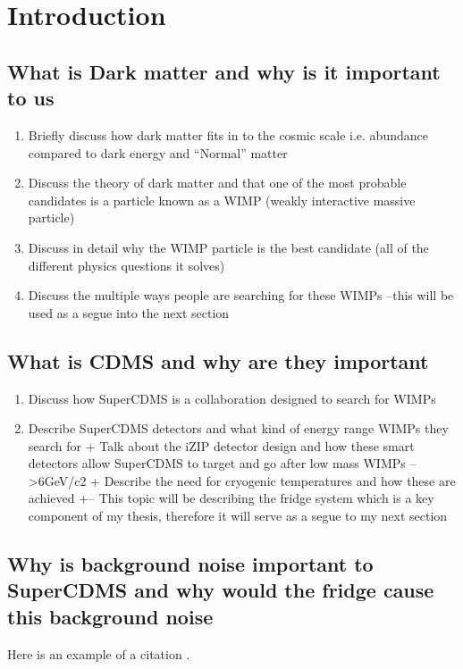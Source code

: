 \section{Introduction}
\subsection{What is Dark matter and why is it important to us} \label{sec:darkmatter}
\begin{figure}
\label{fig:galaxies}
\end{figure}

\begin{enumerate}
    \item Briefly discuss how dark matter fits in to the cosmic scale i.e. abundance compared to dark energy and “Normal” matter
    \item Discuss the theory of dark matter and that one of the most probable candidates is a particle known as a WIMP (weakly interactive massive particle)
    \item Discuss in detail why the WIMP particle is the best candidate (all of the different physics questions it solves)
    \item Discuss the multiple ways people are searching for these WIMPs –this will be used as a segue into the next section
\end{enumerate}

\subsection{What is CDMS and why are they important}

\begin{enumerate}
    \item Discuss how SuperCDMS is a collaboration designed to search for WIMPs
    \item Describe SuperCDMS detectors and what kind of energy range WIMPs they search for 
        + Talk about the iZIP detector design and how these smart detectors allow SuperCDMS to target and go after low mass WIMPs –   >6GeV/c2
        + Describe the need for cryogenic temperatures and how these are achieved
        +--	This topic will be describing the fridge system which is a key component of my thesis, therefore it will serve as a segue to my next section 
\end{enumerate}

\subsection{	Why is background noise important to SuperCDMS and why would the fridge cause this background noise}
Here is an example of a citation \cite{pyle2012}.

